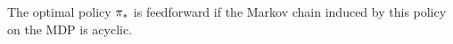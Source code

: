 \begin{definition}
\label{asp: wang feedforward}
    The optimal policy ${\pi}_*$ is feedforward if the Markov chain induced by this policy on the MDP is acyclic.
\end{definition}